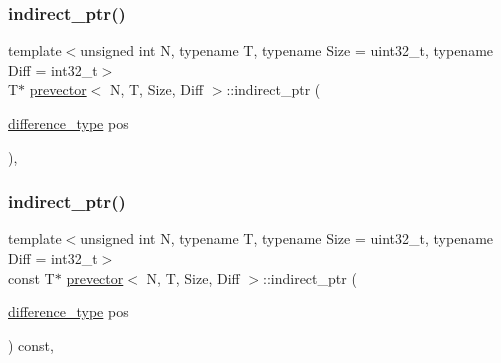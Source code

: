 \mbox{\label{classprevector_ae3343cc65be9fd678b4a6f8305624de6}} 
\subsubsection{\texorpdfstring{indirect\+\_\+ptr()}{indirect\_ptr()}\hspace{0.1cm}{\footnotesize\ttfamily [1/2]}}
{\footnotesize\ttfamily template$<$unsigned int N, typename T, typename Size = uint32\+\_\+t, typename Diff = int32\+\_\+t$>$ \\
T$\ast$ \mbox{\hyperlink{classprevector}{prevector}}$<$ N, T, Size, Diff $>$\+::indirect\+\_\+ptr (\begin{DoxyParamCaption}\item[{\mbox{\hyperlink{classprevector_a34ad7f610eefb33a8db9161cadf15dbe}{difference\+\_\+type}}}]{pos }\end{DoxyParamCaption})\hspace{0.3cm}{\ttfamily [inline]}, {\ttfamily [private]}}

\mbox{\label{classprevector_a50726bfa612cd65bb8bbee9a22942ced}} 
\subsubsection{\texorpdfstring{indirect\+\_\+ptr()}{indirect\_ptr()}\hspace{0.1cm}{\footnotesize\ttfamily [2/2]}}
{\footnotesize\ttfamily template$<$unsigned int N, typename T, typename Size = uint32\+\_\+t, typename Diff = int32\+\_\+t$>$ \\
const T$\ast$ \mbox{\hyperlink{classprevector}{prevector}}$<$ N, T, Size, Diff $>$\+::indirect\+\_\+ptr (\begin{DoxyParamCaption}\item[{\mbox{\hyperlink{classprevector_a34ad7f610eefb33a8db9161cadf15dbe}{difference\+\_\+type}}}]{pos }\end{DoxyParamCaption}) const\hspace{0.3cm}{\ttfamily [inline]}, {\ttfamily [private]}}

\mbox{\label{classprevector_ad4f368a9aa3f0f650e1b2a0894dafe51}} 
